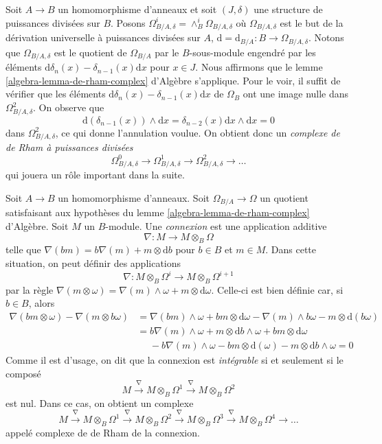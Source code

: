 \begin{remark}
\label{remark-divided-powers-de-rham-complex}
Soit $A \to B$ un homomorphisme d'anneaux et soit $(J, \delta)$ une structure de
puissances divisées sur $B$. Posons
$\Omega_{B/A, \delta}^i = \wedge^i_B \Omega_{B/A, \delta}$
où $\Omega_{B/A, \delta}$ est le but de la dérivation universelle à puissances divisées
sur $A$, $\text{d} = \text{d}_{B/A} : B \to \Omega_{B/A, \delta}$.
Notons que $\Omega_{B/A, \delta}$ est le quotient de $\Omega_{B/A}$ par le
$B$-sous-module engendré par les éléments
$\text{d}\delta_n(x) - \delta_{n - 1}(x)\text{d}x$ pour $x \in J$.
Nous affirmons que le lemme \ref{algebra-lemma-de-rham-complex} d'Algèbre s'applique.
Pour le voir, il suffit de vérifier que les éléments
$\text{d}\delta_n(x) - \delta_{n - 1}(x)\text{d}x$
de $\Omega_B$ ont une image nulle dans $\Omega^2_{B/A, \delta}$.
On observe que
$$
\text{d}(\delta_{n - 1}(x)) \wedge \text{d}x
= \delta_{n - 2}(x) \text{d}x \wedge \text{d}x = 0
$$
dans $\Omega^2_{B/A, \delta}$, ce qui donne l'annulation voulue. On obtient donc un
{\it complexe de de Rham à puissances divisées}
$$
\Omega^0_{B/A, \delta} \to \Omega^1_{B/A, \delta} \to
\Omega^2_{B/A, \delta} \to \ldots
$$
qui jouera un rôle important dans la suite.
\end{remark}

\begin{remark}
\label{remark-connection}
Soit $A \to B$ un homomorphisme d'anneaux. Soit $\Omega_{B/A} \to \Omega$
un quotient satisfaisant aux hypothèses du
lemme \ref{algebra-lemma-de-rham-complex} d'Algèbre.
Soit $M$ un $B$-module. Une {\it connexion} est une application additive
$$
\nabla : M \longrightarrow M \otimes_B \Omega
$$
telle que $\nabla(bm) = b \nabla(m) + m \otimes \text{d}b$
pour $b \in B$ et $m \in M$. Dans cette situation, on peut définir des applications
$$
\nabla : M \otimes_B \Omega^i \longrightarrow M \otimes_B \Omega^{i + 1}
$$
par la règle $\nabla(m \otimes \omega) = \nabla(m) \wedge \omega +
m \otimes \text{d}\omega$. Celle-ci est bien définie car, si $b \in B$, alors
\begin{align*}
\nabla(bm \otimes \omega) - \nabla(m \otimes b\omega)
& =
\nabla(bm) \wedge \omega + bm \otimes \text{d}\omega
- \nabla(m) \wedge b\omega - m \otimes \text{d}(b\omega) \\
& =
b\nabla(m) \wedge \omega + m \otimes \text{d}b \wedge \omega
+ bm \otimes \text{d}\omega \\
& \ \ \ \ \ \ - b\nabla(m) \wedge \omega - bm \otimes \text{d}(\omega)
- m \otimes \text{d}b \wedge \omega = 0
\end{align*}
Comme il est d'usage, on dit que la connexion est {\it intégrable} si et
seulement si le composé
$$
M \xrightarrow{\nabla} M \otimes_B \Omega^1
\xrightarrow{\nabla} M \otimes_B \Omega^2
$$
est nul. Dans ce cas, on obtient un complexe
$$
M \xrightarrow{\nabla} M \otimes_B \Omega^1
\xrightarrow{\nabla} M \otimes_B \Omega^2
\xrightarrow{\nabla} M \otimes_B \Omega^3
\xrightarrow{\nabla} M \otimes_B \Omega^4 \to \ldots
$$
appelé complexe de de Rham de la connexion.
\end{remark}

